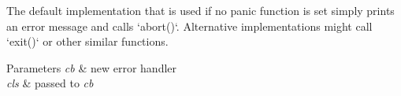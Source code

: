 \-The default implementation that is used if no panic function is set simply prints an error message and calls `abort()`. \-Alternative implementations might call `exit()` or other similar functions.


\begin{DoxyParams}{\-Parameters}
{\em cb} & new error handler \\
\hline
{\em cls} & passed to {\itshape cb\/} \\
\hline
\end{DoxyParams}
